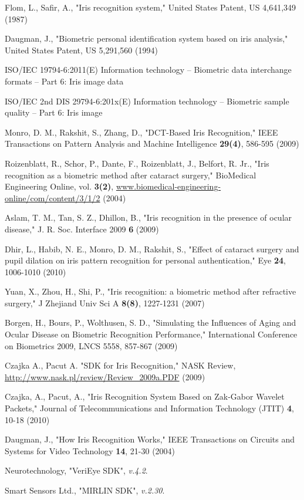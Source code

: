\documentclass[a4paper]{spie}
\begin{document}
\begin{thebibliography}{99}

Flom, L., Safir, A., "Iris recognition system," United States Patent, US 4,641,349 (1987)

Daugman, J., "Biometric personal identification system based on iris analysis," United States Patent, US 5,291,560 (1994)

 ISO/IEC 19794-6:2011(E) Information technology -- Biometric data interchange formats -- Part 6: Iris image data

 ISO/IEC 2nd DIS 29794-6:201x(E) Information technology -- Biometric sample quality -- Part 6: Iris image

Monro, D. M., Rakshit, S., Zhang, D., "DCT-Based Iris Recognition," IEEE Transactions on Pattern Analysis and Machine Intelligence \textbf{29(4)}, 586-595 (2009)

 Roizenblatt, R., Schor, P., Dante, F., Roizenblatt, J., Belfort, R. Jr., "Iris recognition as a biometric method after cataract surgery," BioMedical Engineering Online, vol. \textbf{3(2)}, \url{www.biomedical-engineering-online/com/content/3/1/2} (2004)

Aslam, T. M., Tan, S. Z., Dhillon, B., "Iris recognition in the presence of ocular disease," J. R. Soc. Interface 2009 \textbf{6} (2009)

 Dhir, L., Habib, N. E., Monro, D. M., Rakshit, S., "Effect of cataract surgery and pupil dilation on iris pattern recognition for personal authentication," Eye \textbf{24}, 1006-1010 (2010)

 Yuan, X., Zhou, H., Shi, P., "Iris recognition: a biometric method after refractive surgery," J Zhejiand Univ Sci A \textbf{8(8)}, 1227-1231 (2007)

 Borgen, H., Bours, P., Wolthusen, S. D., "Simulating the Influences of Aging and Ocular Disease on Biometric Recognition Performance," International Conference on Biometrics 2009, LNCS 5558, 857-867 (2009)

 Czajka A., Pacut A. "SDK for Iris Recognition," NASK Review, \url{http://www.nask.pl/review/Review_2009a.PDF} (2009)
             
Czajka, A., Pacut, A., "Iris Recognition System Based on Zak-Gabor Wavelet Packets," Journal of Telecommunications and Information Technology (JTIT) \textbf{4}, 10-18 (2010)

Daugman, J., "How Iris Recognition Works," IEEE Transactions on Circuits and Systems for Video Technology \textbf{14}, 21-30 (2004)

 Neurotechnology, "VeriEye SDK", \textit{v.4.2}.

 Smart Sensors Ltd., "MIRLIN SDK", \textit{v.2.30}.

\end{thebibliography}
\end{document}
